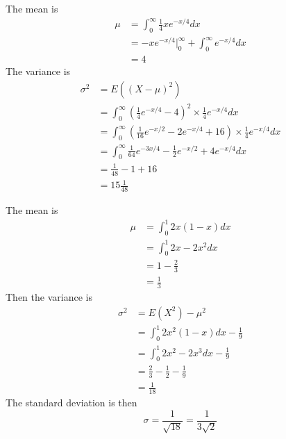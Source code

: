 \documentclass[answers]{exam}
\begin{document}
\begin{questions}
\begin{solution}
	The mean is
	\begin{align*}
		\mu &= \int_0^\infty \frac{1}{4}xe^{-x/4}dx \\
		    &= -xe^{-x/4} \Big |_0^\infty + \int_0^\infty e^{-x/4}dx \\
		    &= 4
	\end{align*}
	The variance is
	\begin{align*}
		\sigma^2 &= E((X-\mu)^2) \\
			 &= \int_0^\infty (\frac{1}{4}e^{-x/4}-4)^2\times\frac{1}{4}e^{-x/4}dx \\
			 &= \int_0^\infty (\frac{1}{16}e^{-x/2} - 2e^{-x/4} + 16)\times\frac{1}{4}e^{-x/4}dx \\
			 &= \int_0^\infty \frac{1}{64}e^{-3x/4} - \frac{1}{2}e^{-x/2} + 4e^{-x/4} dx \\
			 &= \frac{1}{48} - 1 + 16 \\
			 &= 15\frac{1}{48}
	\end{align*}
\end{solution}


\begin{solution}
	The mean is
	\begin{align*}
		\mu &= \int_0^1 2x(1-x)dx \\
		    &= \int_0^1 2x - 2x^2 dx \\
		    &= 1 - \frac{2}{3} \\
		    &= \frac{1}{3}
	\end{align*}
	Then the variance is
	\begin{align*}
		\sigma^2 &= E(X^2) - \mu^2 \\
			 &= \int_0^1 2x^2(1-x)dx - \frac{1}{9} \\
			 &= \int_0^1 2x^2 - 2x^3 dx - \frac{1}{9} \\
			 &= \frac{2}{3} - \frac{1}{2} - \frac{1}{9} \\
			 &= \frac{1}{18}
	\end{align*}
	The standard deviation is then
	$$\sigma = \frac{1}{\sqrt{18}} = \frac{1}{3\sqrt{2}}$$
\end{solution}


\end{questions}
\end{document}
